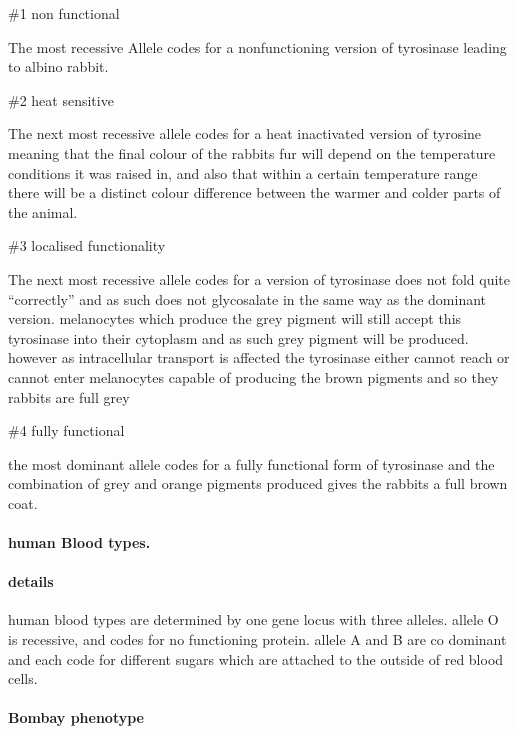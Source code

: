 \documentclass[]{article}
\let\oldparagraph\paragraph
\renewcommand{\paragraph}[1]{\oldparagraph{#1}\mbox{}}
\begin{document}
\#1 non functional

The most recessive Allele codes for a nonfunctioning version of
tyrosinase leading to albino rabbit.

\#2 heat sensitive

The next most recessive allele codes for a heat inactivated version of
tyrosine meaning that the final colour of the rabbits fur will depend on
the temperature conditions it was raised in, and also that within a
certain temperature range there will be a distinct colour difference
between the warmer and colder parts of the animal.

\#3 localised functionality

The next most recessive allele codes for a version of tyrosinase does
not fold quite ``correctly'' and as such does not glycosalate in the
same way as the dominant version. melanocytes which produce the grey
pigment will still accept this tyrosinase into their cytoplasm and as
such grey pigment will be produced. however as intracellular transport
is affected the tyrosinase either cannot reach or cannot enter
melanocytes capable of producing the brown pigments and so they rabbits
are full grey

\#4 fully functional

the most dominant allele codes for a fully functional form of tyrosinase
and the combination of grey and orange pigments produced gives the
rabbits a full brown coat.

\hypertarget{human-blood-types.}{%
\paragraph{human Blood types.}\label{human-blood-types.}}

\hypertarget{details-2}{%
\paragraph{details}\label{details-2}}

human blood types are determined by one gene locus with three alleles.
allele O is recessive, and codes for no functioning protein. allele A
and B are co dominant and each code for different sugars which are
attached to the outside of red blood cells.

\hypertarget{bombay-phenotype}{%
\paragraph{Bombay phenotype}\label{bombay-phenotype}}
\end{document}
